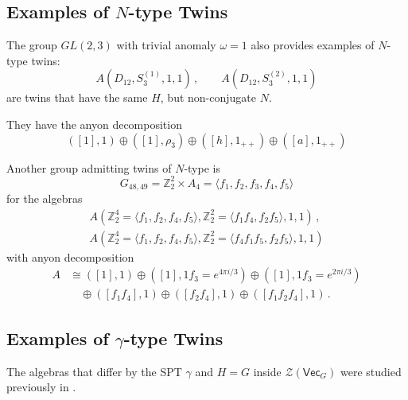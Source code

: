 \documentclass[aps,twocolumn,prx,floatfix,preprintnumbers, nofootinbib,10pt]{revtex4-2}
\numberwithin{equation}{section}
\theoremstyle{definition}
\newcommand{\be}{\begin{equation}}
\newcommand{\ee}{\end{equation}}
\newcommand{\ba}{\begin{aligned}}
\newcommand{\ea}{\end{aligned}}
\newcommand{\Z}{{\mathbb Z}}
\newcommand{\cZ}{\mathcal{Z}}
\renewcommand{\Vec}{\mathsf{Vec}}
\begin{document}
\subsection{Examples of $N$-type Twins}
\label{sec:Ex-Ntype}

The group $GL(2,3)$ with trivial anomaly $\omega=1$ also provides examples of $N$-type twins: 
\be
A(D_{12}, S_3^{(1)}, 1, 1) \,,\qquad 
A(D_{12}, S_3^{(2)}, 1, 1)
\ee
are twins that have the same $H$, but non-conjugate $N$. 

They have the anyon decomposition
\begin{equation}
    ([1],1)\oplus([1],\rho_3)\oplus([h],1_{++})\oplus([a],1_{++})
\end{equation}

Another group admitting twins of $N$-type is 
\be
    G_{48,49} = \Z_2^2 \times A_4 = \langle f_1, f_2, f_3, f_4, f_5 \rangle
\ee
for the algebras
\be\ba
    A(\Z_2^4=\langle f_1,f_2,f_4,f_5\rangle, \Z_2^2=\langle f_1 f_4,f_2 f_5\rangle, 1, 1)\,,\\
    A(\Z_2^4=\langle f_1,f_2,f_4,f_5\rangle, \Z_2^2=\langle f_4 f_1 f_5,f_2 f_5\rangle, 1, 1)
\ea\ee
with anyon decomposition
\be\ba
    A& \cong([1],1)\oplus ([1],1 f_3=e^{4\pi i/3})\oplus([1],1 f_3=e^{2\pi i/3})\\
    & \quad \oplus([f_1 f_4],1)\oplus([f_2 f_4],1)\oplus([f_1 f_2 f_4],1) \,.
\ea\ee


\subsection{Examples of $\gamma$-type Twins}
\label{sec:Ex-ganmmatype}

The algebras that differ by the SPT $\gamma$ and $H=G$ inside $\cZ(\Vec_G)$ were studied previously in \cite{Pollmann:2012,Kobayashi:2025pxs, Kobayashi:2025ykb}.
\end{document}
